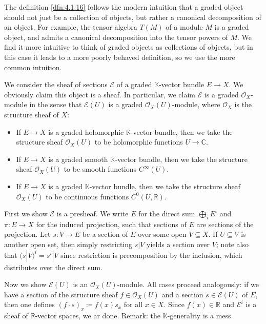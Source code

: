 \begin{remark}\label{4.1.17}
	The definition \cref{dfn:4.1.16} follows the modern intuition that a graded object should not just be a collection of objects, but rather a canonical decomposition of an object. For example, the tensor algebra $T(M)$ of a module $M$ is a graded object, and admits a canonical decomposition into the tensor powers of $M$. We find it more intuitive to think of graded objects as collections of objects, but in this case it leads to a more poorly behaved definition, so we use the more common intuition.
\end{remark}

\begin{discussion}
	We consider the sheaf of sections $\mathcal{E} $ of a graded $\mathbb{K} $-vector bundle $E\to X$. We obviously claim this object is a sheaf. In particular, we claim $\mathcal{E} $ is a graded $\mathcal{O} _X$-module in the sense that $\mathcal{E} (U)$ is a graded $\mathcal{O} _X(U)$-module, where $\mathcal{O} _X$ is the structure sheaf of $X$:
	\begin{itemize}
		\item If $E\to X$ is a graded holomorphic $\mathbb{K} $-vector bundle, then we take the structure sheaf $\mathcal{O} _X(U)$ to be holomorphic functions $U\to \mathbb{C} $.
		\item If $E\to X$ is a graded smooth $\mathbb{K} $-vector bundle, then we take the structure sheaf $\mathcal{O} _X(U)$ to be smooth functions $C^\infty (U)$.
		\item If $E\to X$ is a graded $\mathbb{K} $-vector bundle, then we take the structure sheaf $\mathcal{O} _X(U)$ to be continuous functions $C^0(U,\mathbb{R} )$.
	\end{itemize}
	
	First we show $\mathcal{E} $ is a presheaf. We write $E$ for the direct sum $\bigoplus_{i} E^i$ and $\pi : E \to X$ for the induced projection, such that sections of $E$ are sections of the projection. Let $s : V \to E$ be a section of $E$ over some open $V\subseteq X$. If $U\subseteq V$ is another open set, then simply restricting $s|V$ yields a section over $V$; note also that $(s|V)^i = s^i|V$ since restriction is precomposition by the inclusion, which distributes over the direct sum.

	Now we show $\mathcal{E} (U)$ is an $\mathcal{O} _X(U)$-module. All cases proceed analogously: if we have a section of the structure sheaf $f\in \mathcal{O} _X(U)$ and a section $s\in \mathcal{E} (U)$ of $E$, then one defines $(f\cdot s)_x \coloneqq f(x)s_x$ for all $x\in X$. Since $f(x)\in\mathbb{R} $ and $\mathcal{E}^i$ is a sheaf of $\mathbb{R} $-vector spaces, we ar done. Remark: the $\mathbb{K} $-generality is a mess
\end{discussion}


